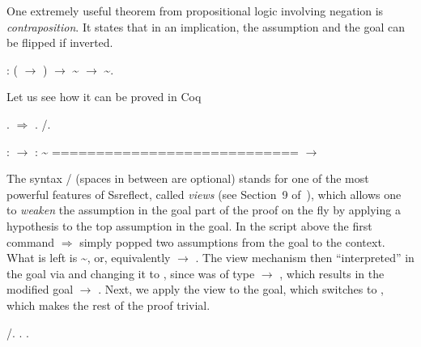 One extremely useful theorem from propositional logic involving
negation is \textit{contraposition}. It states that in an implication, the
assumption and the goal can be flipped if inverted.


\begin{coqdoccode}
\coqdocemptyline
\coqdocnoindent
{} : ( \ensuremath{\rightarrow} ) \ensuremath{\rightarrow} \textasciitilde{} \ensuremath{\rightarrow} \textasciitilde{}.\coqdoceol
\coqdocemptyline
\end{coqdoccode}
Let us see how it can be proved in Coq \begin{coqdoccode}
\coqdocemptyline
\coqdocnoindent
{}.\coqdoceol
\coqdocnoindent
{}\ensuremath{\Rightarrow}  .\coqdoceol
\coqdocnoindent
{} /.\coqdoceol
\end{coqdoccode}
\coqdoceol
\coqdocemptyline
\coqdocindent{1.00em}
 :  \ensuremath{\rightarrow} \coqdoceol
\coqdocindent{1.00em}
 : \textasciitilde {}\coqdoceol
\coqdocindent{1.00em}
============================\coqdoceol
\coqdocindent{1.50em}
 \ensuremath{\rightarrow} 

\coqdocemptyline


The syntax  /  (spaces in between are optional) stands for one
of the most powerful features of Ssreflect, called \textit{views} (see
Section~9 of~\cite{Gontier-al:TR}), which allows one to \textit{weaken} the
assumption in the goal part of the proof on the fly by applying a
hypothesis  to the top assumption in the goal. In the script above
the first command \ensuremath{\Rightarrow}   simply popped two assumptions from the
goal to the context. What is left is \textasciitilde{}, or, equivalently  \ensuremath{\rightarrow}
. The view mechanism then ``interpreted''  in the goal via 
and changing it to , since  was of type  \ensuremath{\rightarrow} , which results
in the modified goal  \ensuremath{\rightarrow} .  Next, we apply the view  to
the goal, which switches  to , which makes the rest of the
proof trivial.  \begin{coqdoccode}
\coqdocemptyline
\coqdocnoindent
{} /.\coqdoceol
\coqdocnoindent
{}.\coqdoceol
\coqdocnoindent
{}.\coqdoceol
\coqdocemptyline
\coqdocemptyline
\coqdocemptyline
\end{coqdoccode}
